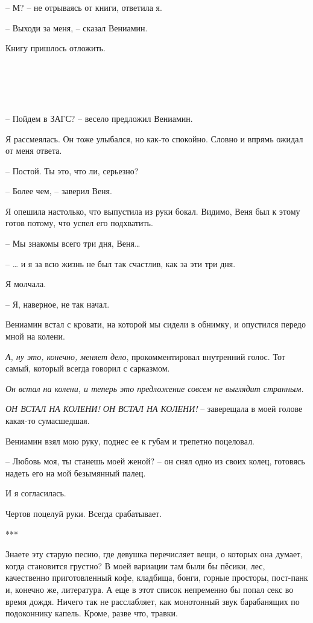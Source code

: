 \documentclass[
]{book}
\begin{document}
-- М? -- не отрываясь от книги, ответила я.

-- Выходи за меня, -- сказал Вениамин.

Книгу пришлось отложить.

\hypertarget{chapter-13}{%
\chapter{~}\label{chapter-13}}

-- Пойдем в ЗАГС? -- весело предложил Вениамин.

Я рассмеялась. Он тоже улыбался, но как-то спокойно. Словно и впрямь ожидал от меня ответа.

-- Постой. Ты это, что ли, серьезно?

-- Более чем, -- заверил Веня.

Я опешила настолько, что выпустила из руки бокал. Видимо, Веня был к этому готов потому, что успел его подхватить.

-- Мы знакомы всего три дня, Веня\ldots{}

-- \ldots{} и я за всю жизнь не был так счастлив, как за эти три дня.

Я молчала.

-- Я, наверное, не так начал.

Вениамин встал с кровати, на которой мы сидели в обнимку, и опустился передо мной на колени.

\emph{А, ну это, конечно, меняет дело}, прокомментировал внутренний голос. Тот самый, который всегда говорил с сарказмом.

\emph{Он встал на колени, и теперь это предложение совсем не выглядит странным.}

\emph{ОН ВСТАЛ НА КОЛЕНИ! ОН ВСТАЛ НА КОЛЕНИ!} -- заверещала в моей голове какая-то сумасшедшая.

Вениамин взял мою руку, поднес ее к губам и трепетно поцеловал.

-- Любовь моя, ты станешь моей женой? -- он снял одно из своих колец, готовясь надеть его на мой безымянный палец.

И я согласилась.

Чертов поцелуй руки. Всегда срабатывает.

***

Знаете эту старую песню, где девушка перечисляет вещи, о которых она думает, когда становится грустно? В моей вариации там были бы пёсики, лес, качественно приготовленный кофе, кладбища, бонги, горные просторы, пост-панк и, конечно же, литература. А еще в этот список непременно бы попал секс во время дождя. Ничего так не расслабляет, как монотонный звук барабанящих по подоконнику капель. Кроме, разве что, травки.
\end{document}

